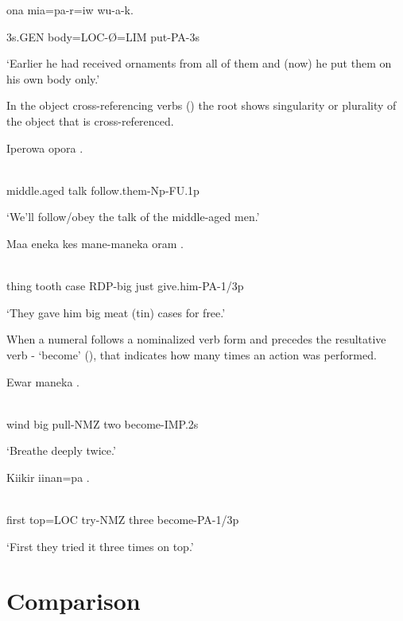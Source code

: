 ona  mia=pa-r=iw  wu-a-k.

3s.GEN  body=LOC-{\O}=LIM  put-PA-3s

`Earlier he had received ornaments from all of them and (now) he put them on his own body only.'

In the object cross-referencing verbs () the root shows singularity or plurality of the object that is cross-referenced.

\ea%
\label{ex:x1303}
\gll Iperowa  opora  . \\
      \\
\glt
\z

middle.aged  talk  follow.them-Np-FU.1p

`We'll follow/obey the talk of the middle-aged men.'

\ea%
\label{ex:x1304}
\gll Maa  eneka  kes  mane-maneka  oram  . \\
      \\
\glt
\z

thing  tooth  case  RDP-big  just  give.him-PA-1/3p

`They gave him big meat (tin) cases for free.'

When a numeral follows a nominalized verb form and precedes the resultative verb - `become' (), that indicates how many times an action was performed. 

\ea%
\label{ex:x1305}
\gll Ewar  maneka  . \\
      \\
\glt
\z

wind  big  pull-NMZ  two  become-IMP.2s

`Breathe deeply twice.'

\ea%
\label{ex:x1306}
\gll Kiikir  iinan=pa  . \\
      \\
\glt
\z

first  top=LOC  try-NMZ  three  become-PA-1/3p

`First they tried it three times on top.'

\section{Comparison}
\hypertarget{RefHeading22621935131865}{}
